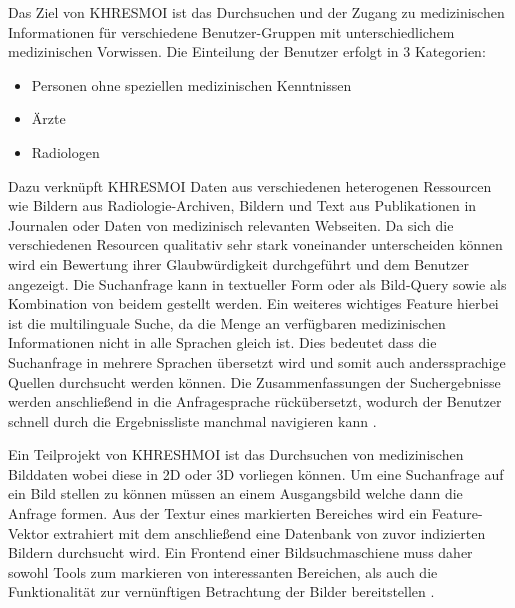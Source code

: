 Das Ziel von KHRESMOI ist das Durchsuchen und der Zugang zu medizinischen Informationen für verschiedene Benutzer-Gruppen mit unterschiedlichem medizinischen Vorwissen.
Die Einteilung der Benutzer erfolgt in 3 Kategorien:
\begin{itemize}
	\item Personen ohne speziellen medizinischen Kenntnissen
	\item Ärzte
	\item Radiologen
\end{itemize}
Dazu verknüpft KHRESMOI Daten aus verschiedenen heterogenen Ressourcen wie Bildern aus Radiologie-Archiven, Bildern und Text aus Publikationen in Journalen oder Daten von medizinisch relevanten Webseiten.
Da sich die verschiedenen Resourcen qualitativ sehr stark voneinander unterscheiden können wird ein Bewertung ihrer Glaubwürdigkeit durchgeführt und dem Benutzer angezeigt.  
Die Suchanfrage kann in textueller Form oder als Bild-Query sowie als Kombination von beidem gestellt werden.
Ein weiteres wichtiges Feature hierbei ist die multilinguale Suche, da die Menge an verfügbaren medizinischen Informationen nicht in alle Sprachen gleich ist.
Dies bedeutet dass die Suchanfrage in mehrere Sprachen übersetzt wird und somit auch anderssprachige Quellen durchsucht werden können.
Die Zusammenfassungen der Suchergebnisse werden anschließend in die Anfragesprache rückübersetzt, 
wodurch der Benutzer schnell durch die Ergebnissliste manchmal navigieren kann \cite{kres}.

Ein Teilprojekt von KHRESHMOI ist das Durchsuchen von medizinischen Bilddaten wobei diese in 2D oder 3D vorliegen können.
Um eine Suchanfrage auf ein Bild stellen zu können müssen an einem Ausgangsbild  welche dann die Anfrage formen.
Aus der Textur eines markierten Bereiches wird ein Feature-Vektor extrahiert mit dem anschließend eine Datenbank von zuvor indizierten Bildern durchsucht wird.
%
Ein Frontend einer Bildsuchmaschiene muss daher sowohl Tools zum markieren von interessanten Bereichen, 
als auch die Funktionalität zur vernünftigen Betrachtung der Bilder bereitstellen \cite{kres}.

